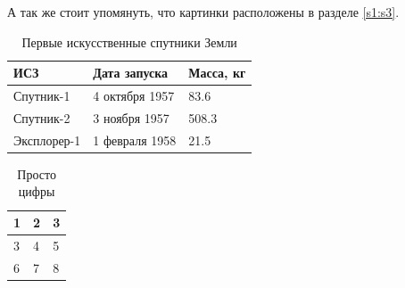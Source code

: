 \documentclass{article}
\begin{document}
А так же стоит упомянуть, что картинки расположены в разделе \ref{s1:s3}.

\begin{table}[t]
	\caption{Первые искусственные спутники Земли}
	\centering
	\begin{tabular}{ | l | l | l |}
	\hline
	ИСЗ & Дата запуска & Масса, кг      \\ \hline
	Спутник-1 & 4 октября 1957 & 83.6   \\ \hline
	Спутник-2 & 3 ноября 1957 & 508.3   \\ \hline
	Эксплорер-1 & 1 февраля 1958 & 21.5 \\
	\hline
	\end{tabular}
	\label{table:table_1}
\end{table}

\begin{table}[h]
	\caption{Просто цифры}
	\centering
	\begin{tabular}{ | l | l | l |}
	\hline
	1 & 2 & 3      \\ \hline
	3 & 4 & 5   \\ \hline
	6 & 7 & 8   \\
	\hline
	\end{tabular}
	\label{table:table_2}
\end{table}

\newpage

\tableofcontents
\newpage
\printbibliography
\end{document}
